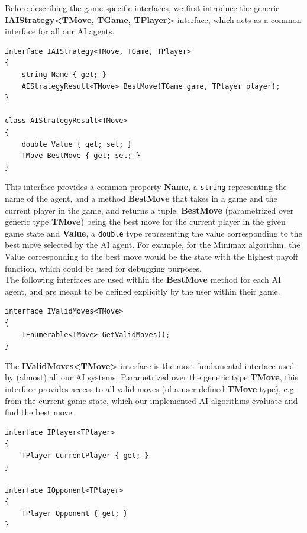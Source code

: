 Before describing the game-specific interfaces, we first introduce the generic \textbf{IAIStrategy\textless{}TMove, TGame, TPlayer\textgreater{}} interface, which acts as a common interface for all our \gls{AI} agents.
\begin{lstlisting}
interface IAIStrategy<TMove, TGame, TPlayer>
{
    string Name { get; }
    AIStrategyResult<TMove> BestMove(TGame game, TPlayer player);
}

class AIStrategyResult<TMove>
{
    double Value { get; set; }
    TMove BestMove { get; set; }
}
\end{lstlisting}
This interface provides a common property \textbf{Name}, a \texttt{string} representing the name of the agent, and a method \textbf{BestMove} that takes in a game and the current player in the game, and returns a tuple, \textbf{BestMove} (parametrized over generic type \textbf{TMove}) being the best move for the current player in the given game state and \textbf{Value}, a \texttt{double} type representing the value corresponding to the best move selected by the \gls{AI} agent.
For example, for the Minimax algorithm, the Value corresponding to the best move would be the state with the highest payoff function, which could be used for debugging purposes.
\\
The following interfaces are used within the \textbf{BestMove} method for each \gls{AI} agent, and are meant to be defined explicitly by the user within their game.

\begin{lstlisting}
interface IValidMoves<TMove>
{
    IEnumerable<TMove> GetValidMoves();
}
\end{lstlisting}

The \textbf{IValidMoves\textless{}TMove\textgreater{}} interface is the most fundamental interface used by (almost) all our \gls{AI} systems. Parametrized over the generic type \textbf{TMove}, this interface provides access to all valid moves (of a user-defined \textbf{TMove} type), e.g from the current game state, which our implemented \ac{AI} algorithms evaluate and find the best move.

\begin{lstlisting}
interface IPlayer<TPlayer>
{
    TPlayer CurrentPlayer { get; }
}

interface IOpponent<TPlayer>
{
    TPlayer Opponent { get; }
}
\end{lstlisting}

